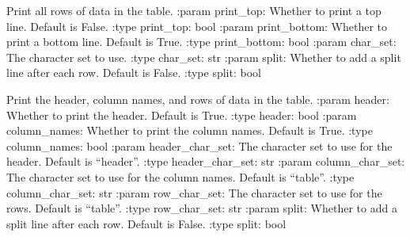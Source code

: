\documentclass[letterpaper,10pt,english]{sphinxmanual}
\begin{document}
\begin{fulllineitems}
\begin{fulllineitems}
\label{\detokenize{nodes:nodes.nodePrinter.tablePrinter.print_rows}}
\pysigstartsignatures
\pysiglinewithargsret
{}
{\sphinxparamcomma {}\sphinxparamcomma {}\sphinxparamcomma {}}
{}
\pysigstopsignatures
\sphinxAtStartPar
Print all rows of data in the table.
:param print\_top: Whether to print a top line. Default is False.
:type print\_top: bool
:param print\_bottom: Whether to print a bottom line. Default is True.
:type print\_bottom: bool
:param char\_set: The character set to use.
:type char\_set: str
:param split: Whether to add a split line after each row. Default is False.
:type split: bool

\end{fulllineitems}


\begin{fulllineitems}
\label{\detokenize{nodes:nodes.nodePrinter.tablePrinter.print_table}}
\pysigstartsignatures
\pysiglinewithargsret
{}
{\sphinxparamcomma {}\sphinxparamcomma {}\sphinxparamcomma {}\sphinxparamcomma {}\sphinxparamcomma {}}
{}
\pysigstopsignatures
\sphinxAtStartPar
Print the header, column names, and rows of data in the table.
:param header: Whether to print the header. Default is True.
:type header: bool
:param column\_names: Whether to print the column names. Default is True.
:type column\_names: bool
:param header\_char\_set: The character set to use for the header. Default is “header”.
:type header\_char\_set: str
:param column\_char\_set: The character set to use for the column names. Default is “table”.
:type column\_char\_set: str
:param row\_char\_set: The character set to use for the rows. Default is “table”.
:type row\_char\_set: str
:param split: Whether to add a split line after each row. Default is False.
:type split: bool

\end{fulllineitems}


\end{fulllineitems}
\end{document}
